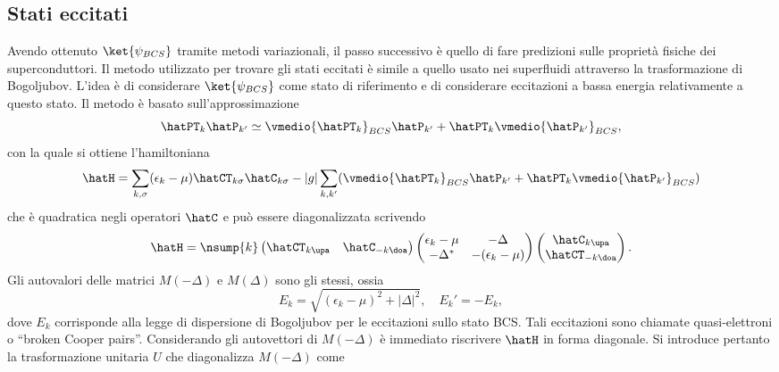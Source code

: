 \subsection{Stati eccitati}
Avendo ottenuto $\ket{\psi_{BCS}}$ tramite metodi variazionali, il passo successivo è quello di fare predizioni sulle proprietà fisiche dei superconduttori. Il metodo utilizzato per trovare gli stati eccitati è simile a quello usato nei superfluidi attraverso la trasformazione di Bogoljubov. L'idea è di considerare $\ket{\psi_{BCS}}$ come stato di riferimento e di considerare eccitazioni a bassa energia relativamente a questo stato. Il metodo è basato sull'approssimazione 
\begin{equation}
    \hatPT_k\hatP_{k'} \simeq \vmedio{\hatPT_k}_{BCS} \hatP_{k'} + \hatPT_k\vmedio{\hatP_{k'}}_{BCS},
\end{equation}
con la quale si ottiene l'hamiltoniana
\begin{equation}
    \hatH  = \sum_{k,\sigma}(\epsilon_k - \mu)\hatCT_{k\sigma}\hatC_{k\sigma} - |g|\sum_{k,k'}(\vmedio{\hatPT_k}_{BCS} \hatP_{k'} + \hatPT_k\vmedio{\hatP_{k'}}_{BCS})
\end{equation}
che è quadratica negli operatori $\hatC$ e può essere diagonalizzata scrivendo 
\begin{equation}
    \hatH = \nsump{k}
    \begin{pmatrix}
        \hatCT_{k\upa} & \hatC_{-k\doa}
    \end{pmatrix}
    \begin{pmatrix}
        \epsilon_k - \mu & -\Delta \\
        -\Delta^* & -(\epsilon_k - \mu)
    \end{pmatrix}
    \begin{pmatrix}
        \hatC_{k\upa} \\
        \hatCT_{-k\doa}
    \end{pmatrix}.
\end{equation}
Gli autovalori delle matrici $M(-\Delta)$ e $M(\Delta)$ sono gli stessi, ossia
\begin{equation}
    E_k = \sqrt{(\epsilon_k - \mu)^2 + |\Delta|^2},\quad E_k' = -E_k,
\end{equation}
dove $E_k$ corrisponde alla legge di dispersione di Bogoljubov per le eccitazioni sullo stato BCS. Tali eccitazioni sono chiamate quasi-elettroni o ``broken Cooper pairs''. Considerando gli autovettori di $M(-\Delta)$ è immediato riscrivere $\hatH$ in forma diagonale. Si introduce pertanto la trasformazione unitaria $U$ che diagonalizza $M(-\Delta)$ come
